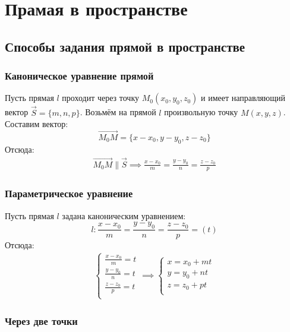 \section{Прамая в пространстве}

\subsection{Способы задания прямой в пространстве}

\subsubsection{Каноническое уравнение прямой}

Пусть прямая $l$ проходит через точку $M_0\left(x_0, y_0, z_0 \right)$ и имеет направляющий вектор $\vec{S} = \{m, n, p\}$.
Возьмём на прямой $l$ произвольную точку $M(x, y, z)$.
Составим вектор: \[
\overrightarrow{M_0M} = \{x - x_0, y - y_0, z - z_0\} 
\] 
Отсюда:
\begin{gather*}
  \overrightarrow{M_0M} \parallel \vec{S} \implies \boxed{\frac{x - x_0}{m} = \frac{y - y_0}{n} = \frac{z - z_0}{p}}
\end{gather*}

\subsubsection{Параметрическое уравнение}

Пусть прямая $l$ задана каноническим уравнением:  \[
l: \frac{x - x_0}{m} = \frac{y - y_0}{n} = \frac{z - z_0}{p} = (t)
\] 
Отсюда:
\begin{gather*}
  \begin{cases}
  \frac{x - x_0}{m} = t \\
  \frac{y - y_0}{n} = t \\
  \frac{z - z_0}{p} = t \\
  \end{cases} \implies \boxed{
  \begin{cases}
    x = x_0 + mt \\
    y = y_0 + nt \\
    z = z_0 + pt \\
  \end{cases}}
\end{gather*}

\subsubsection{Через две точки}

